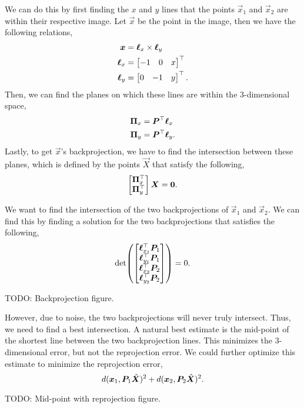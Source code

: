 We can do this by first finding the $x$ and $y$ lines that the points
$\vec{x}_1$ and $\vec{x}_2$ are within their respective image. Let $\vec{x}$ be
the point in the image, then we have the following relations,
\begin{align*}
  \bm{x} &= \bm{\ell}_x \times \bm{\ell}_y \\
  \bm{\ell}_x &= \begin{bmatrix} -1 & 0 & x \end{bmatrix}^\top \\
  \bm{\ell}_y &= \begin{bmatrix} 0 & -1 & y \end{bmatrix}^\top
.\end{align*}
Then, we can find the planes on which these lines are within the 3-dimensional
space,
\begin{align*}
  \bm{\Pi}_x &= \bm{P}^\top \bm{\ell}_x \\
  \bm{\Pi}_y &= \bm{P}^\top \bm{\ell}_y
.\end{align*}
Lastly, to get $\vec{x}$'s backprojection, we have to find the intersection
between these planes, which is defined by the points $\vec{X}$ that satisfy the
following, \[
  \begin{bmatrix} \bm{\Pi}_x^\top \\ \bm{\Pi}_y^\top \end{bmatrix} \bm{X} = \bm{0}
.\]

We want to find the intersection of the two backprojections of $\vec{x}_1$ and
$\vec{x}_2$. We can find this by finding a solution for the two
backprojections that satisfies the following, \[
  \det{\begin{bmatrix} \transpose{\vec{\ell}_{x_1}} \mat{P}_1 \\ \transpose{\vec{\ell}_{y_1}} \mat{P}_1 \\ \transpose{\vec{\ell}_{x_2}} \mat{P}_2 \\ \transpose{\vec{\ell}_{y_2}} \mat{P}_2 \end{bmatrix}} = 0
.\]

TODO: Backprojection figure.

However, due to noise, the two backprojections will never truly intersect.
Thus, we need to find a best intersection. A natural best estimate is the
mid-point of the shortest line between the two backprojection lines. This
minimizes the 3-dimensional error, but not the reprojection error. We could
further optimize this estimate to minimize the reprojection error, \[
  d(\bm{x}_1, \bm{P}_1 \hat{\bm{X}})^2 + d(\bm{x}_2, \bm{P}_2 \hat{\bm{X}})^2
.\]

TODO: Mid-point with reprojection figure.
